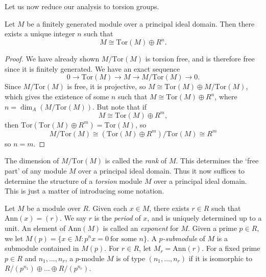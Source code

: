 Let us now reduce our analysis to torsion groups.

\begin{lemma}
    Let $M$ be a finitely generated module over a principal ideal domain. Then there exists a unique integer $n$ such that
    \[ M \cong \text{Tor}(M) \oplus R^n. \]
\end{lemma}
\begin{proof}
    We have already shown $M/\text{Tor}(M)$ is torsion free, and is therefore free since it is finitely generated. We have an exact sequence
    \[ 0 \to \text{Tor}(M) \to M \to M/\text{Tor}(M) \to 0. \]
    Since $M/\text{Tor}(M)$ is free, it is projective, so $M \cong \text{Tor}(M) \oplus M/\text{Tor}(M)$, which gives the existence of some $n$ such that $M \cong \text{Tor}(M) \oplus R^n$, where $n = \dim_A(M/\text{Tor}(M))$. But note that if
    \[ M \cong \text{Tor}(M) \oplus R^m, \]
    then $\text{Tor}(\text{Tor}(M) \oplus R^m) = \text{Tor}(M)$, so
    \[ M/\text{Tor}(M) \cong (\text{Tor}(M) \oplus R^m) / \text{Tor}(M) \cong R^m \]
    so $n = m$.
\end{proof}

The dimension of $M/\text{Tor}(M)$ is called the \emph{rank} of $M$. This determines the `free part' of any module $M$ over a principal ideal domain. Thus it now suffices to determine the structure of a \emph{torsion} module $M$ over a principal ideal domain. This is just a matter of introducing some notation.

Let $M$ be a module over $R$. Given each $x \in M$, there exists $r \in R$ such that $\text{Ann}(x) = (r)$. We say $r$ is the \emph{period} of $x$, and is uniquely determined up to a unit. An element of $\text{Ann}(M)$ is called an \emph{exponent} for $M$. Given a prime $p \in R$, we let $M(p) = \{ x \in M: p^n x = 0\ \text{for some $n$} \}$. A \emph{$p$-submodule} of $M$ is a submodule contained in $M(p)$. For $r \in R$, let $M_r = \text{Ann}(r)$. For a fixed prime $p \in R$ and $n_1, \dots, n_r$, a $p$-module $M$ is of type $(n_1,\dots,n_r)$ if it is isomorphic to $R/(p^{n_1}) \oplus \dots \oplus R/(p^{n_r})$.

